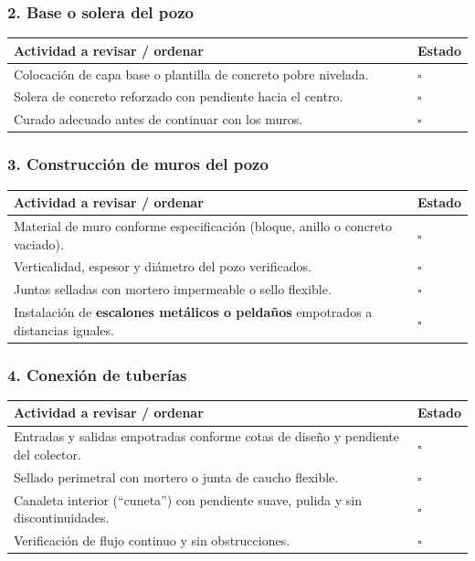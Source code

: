 \documentclass[12pt]{article}
\newcommand{\cbox}{\(\square\)} %
\begin{document}
	\subsubsection*{2. Base o solera del pozo}
	\begin{tabularx}{\linewidth}{>{\raggedright\arraybackslash}p{0.93\linewidth} >{\centering\arraybackslash}m{0.07\linewidth}}
		\toprule
		\textbf{Actividad a revisar / ordenar} & \textbf{Estado}\\
		\midrule
		Colocación de capa base o plantilla de concreto pobre nivelada. & \cbox \\
		Solera de concreto reforzado con pendiente hacia el centro. & \cbox \\
		Curado adecuado antes de continuar con los muros. & \cbox \\
		\bottomrule
	\end{tabularx}
	
	\subsubsection*{3. Construcción de muros del pozo}
	\begin{tabularx}{\linewidth}{>{\raggedright\arraybackslash}p{0.93\linewidth} >{\centering\arraybackslash}m{0.07\linewidth}}
		\toprule
		\textbf{Actividad a revisar / ordenar} & \textbf{Estado}\\
		\midrule
		Material de muro conforme especificación (bloque, anillo o concreto vaciado). & \cbox \\
		Verticalidad, espesor y diámetro del pozo verificados. & \cbox \\
		Juntas selladas con mortero impermeable o sello flexible. & \cbox \\
		Instalación de \textbf{escalones metálicos o peldaños} empotrados a distancias iguales. & \cbox \\
		\bottomrule
	\end{tabularx}
	
	\subsubsection*{4. Conexión de tuberías}
	\begin{tabularx}{\linewidth}{>{\raggedright\arraybackslash}p{0.93\linewidth} >{\centering\arraybackslash}m{0.07\linewidth}}
		\toprule
		\textbf{Actividad a revisar / ordenar} & \textbf{Estado}\\
		\midrule
		Entradas y salidas empotradas conforme cotas de diseño y pendiente del colector. & \cbox \\
		Sellado perimetral con mortero o junta de caucho flexible. & \cbox \\
		Canaleta interior (“cuneta”) con pendiente suave, pulida y sin discontinuidades. & \cbox \\
		Verificación de flujo continuo y sin obstrucciones. & \cbox \\
		\bottomrule
	\end{tabularx}
	
\end{document}
